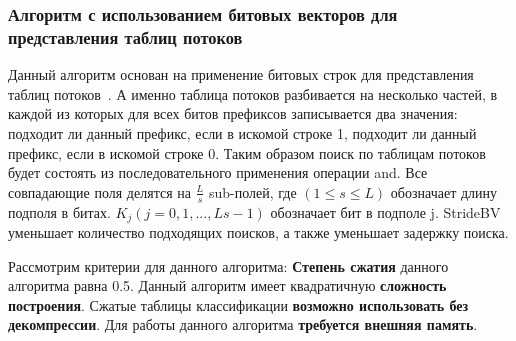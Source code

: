 \documentclass[oneside,final,12pt]{extarticle}
\begin{document}
        \subsubsection{Алгоритм с использованием битовых векторов для представления таблиц потоков}
            Данный алгоритм основан на применение битовых строк для представления таблиц потоков~\cite{shi2020msbv}. А именно таблица потоков разбивается на несколько частей,
            в каждой из которых для всех битов префиксов записывается два значения: подходит ли данный префикс, если в искомой строке 1, 
            подходит ли данный префикс, если в искомой строке 0. Таким образом поиск по таблицам потоков будет состоять из последовательного применения 
            операции and.
            Все совпадающие поля делятся на \(\frac{L}{s}\) sub-полей, где \((1 ≤ s ≤ L)\) обозначает длину подполя в битах. 
            \(K_j (j = 0,1, ..., Ls − 1)\) обозначает бит в подполе j. StrideBV уменьшает количество подходящих поисков, 
            а также уменьшает задержку поиска.             

            Рассмотрим критерии для данного алгоритма: \textbf{Степень сжатия} данного алгоритма равна 0.5.
            Данный алгоритм имеет квадратичную \textbf{сложность построения}. Сжатые таблицы классификации \textbf{возможно использовать без декомпрессии}.
            Для работы данного алгоритма \textbf{требуется внешняя память}.
\end{document}
